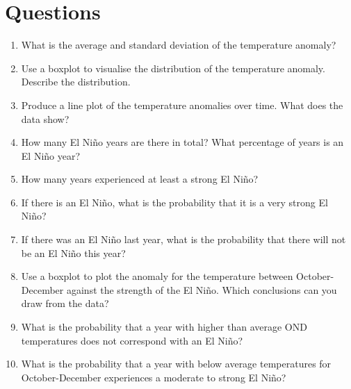 \documentclass{tufte-handout}
\begin{document}
\section{Questions}
\begin{enumerate}
  \item What is the average and standard deviation of the temperature anomaly?
  \item Use a boxplot to visualise the distribution of the temperature anomaly. Describe the distribution.
  \item Produce a line plot of the temperature anomalies over time. What does the data show?
  \item How many El Ni\~no years are there in total? What percentage of years is an El Ni\~no year?
  \item How many years experienced at least a strong El Ni\~no? 
  \item If there is an El Ni\~no, what is the probability that it is a very strong El Ni\~no?
  \item If there was an El Ni\~no last year, what is the probability that there will not be an El Ni\~no this year?
  \item Use a boxplot to plot the anomaly for the temperature between October-December against the strength of the El Ni\~no. Which conclusions can you draw from the data?
  \item What is the probability that a year with higher than average OND temperatures does not correspond with an El Ni\~no?
  \item What is the probability that a year with below average temperatures for October-December experiences a moderate to strong El Ni\~no?
\end{enumerate}
\end{document}
